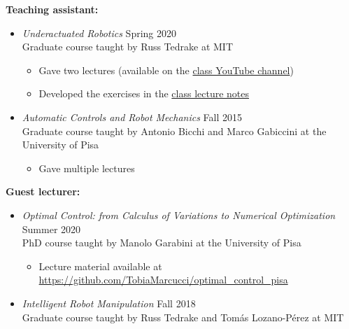 \documentclass[11pt,a4paper,sans]{moderncv}
\begin{document}
\vspace{5pt}

\textbf{Teaching assistant:}

\vspace{5pt}

\begin{itemize}

\item \textit{Underactuated  Robotics} \hfill Spring 2020 \\
Graduate course taught by Russ Tedrake at MIT
\begin{itemize}
\item
Gave two lectures (available on the  \href{https://www.youtube.com/playlist?list=PLkx8KyIQkMfX1WpWYqtep7TOmboZeDtev}{\color{cyan}class YouTube channel})
\item
Developed the exercises in the \href{http://underactuated.csail.mit.edu}{\color{cyan}class lecture notes}
\end{itemize}

\item \textit{Automatic Controls and Robot Mechanics} \hfill Fall 2015 \\
Graduate course taught by Antonio Bicchi and Marco Gabiccini at the University of Pisa
\begin{itemize}
\item
Gave multiple lectures
\end{itemize}

\end{itemize}

\vspace{5pt}

\textbf{Guest lecturer:}

\vspace{5pt}

\begin{itemize}

\item \textit{Optimal Control: from Calculus of Variations to Numerical Optimization} \hfill Summer 2020 \\
PhD course taught by Manolo Garabini at the University of Pisa
\begin{itemize}
\item
Lecture material available at \href{https://github.com/TobiaMarcucci/optimal_control_pisa}{\color{cyan}https://github.com/TobiaMarcucci/optimal\_control\_pisa}
\end{itemize}

\item \textit{Intelligent Robot Manipulation} \hfill Fall 2018 \\
Graduate course taught by Russ Tedrake and Tom\'{a}s Lozano-P\'{e}rez at MIT

\end{itemize}
\end{document}
